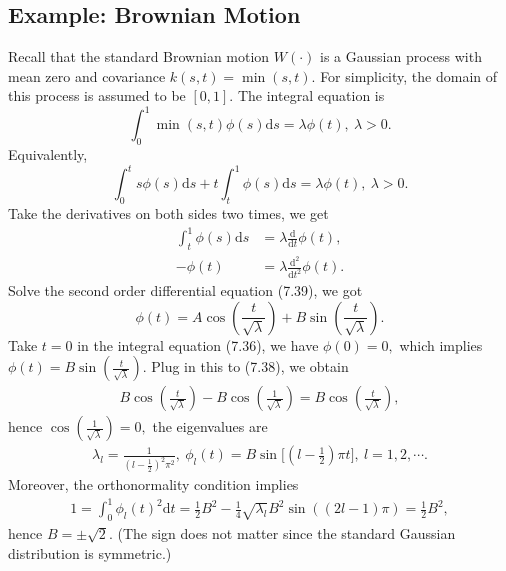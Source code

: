 \documentclass{article}
\begin{document}
\subsection{Example: Brownian Motion}
Recall that the standard Brownian motion $W(\cdot)$ is a Gaussian process with mean zero and covariance $k(s,t) = \min(s,t).$ For simplicity, the domain of this process is assumed to be $[0,1].$ The integral equation is
\begin{equation*}
	\int_0^1 \min(s,t)\phi(s)\mathrm{d}s = \lambda\phi(t),\ \lambda > 0.\tag{7.36}
\end{equation*}
Equivalently,
\begin{equation*}
	\int_0^t s\phi(s)\mathrm{d}s + t\int_t^1 \phi(s)\mathrm{d}s= \lambda\phi(t),\ \lambda > 0.\tag{7.37}
\end{equation*}
Take the derivatives on both sides two times, we get
\begin{align*}
	\int_t^1 \phi(s)\mathrm{d}s &= \lambda\frac{\mathrm{d}}{\mathrm{d}t}\phi(t),\tag{7.38} \\
	-\phi(t) &= \lambda\frac{\mathrm{d}^2}{\mathrm{d}t^2}\phi(t). \tag{7.39}
\end{align*}
Solve the second order differential equation (7.39), we got
\begin{equation*}
	\phi(t) = A\cos\left(\frac{t}{\sqrt{\lambda}}\right) + B\sin\left(\frac{t}{\sqrt{\lambda}}\right). \tag{7.39}
\end{equation*}
Take $t=0$ in the integral equation (7.36), we have $\phi(0)=0,$ which implies $\phi(t) = B\sin\left(\frac{t}{\sqrt{\lambda}}\right).$ Plug in this to (7.38), we obtain
\begin{align*}
B\cos\left(\frac{t}{\sqrt{\lambda}}\right) - B\cos\left(\frac{1}{\sqrt{\lambda}}\right) = B\cos\left(\frac{t}{\sqrt{\lambda}}\right),\tag{7.40}
\end{align*}
hence $\cos\left(\frac{1}{\sqrt{\lambda}}\right)=0,$ the eigenvalues are
\begin{align*}
	\lambda_l = \frac{1}{\left(l - \frac{1}{2}\right)^2\pi^2},\ \phi_l(t) = B\sin\bigl[(l - \frac{1}{2})\pi t\bigl],\ l=1,2,\cdots.\tag{7.41}
\end{align*}
Moreover, the orthonormality condition implies
\begin{align*}
	1 = \int_0^1\phi_l(t)^2\mathrm{d}t = \frac{1}{2}B^2 - \frac{1}{4}\sqrt{\lambda_l}B^2\sin\left((2l-1)\pi\right) = \frac{1}{2}B^2,\tag{7.42}
\end{align*}
hence $B=\pm\sqrt{2}.$ (The sign does not matter since the standard Gaussian distribution is symmetric.)
\end{document}
